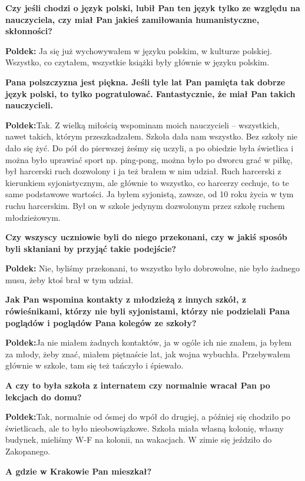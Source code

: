 \textbf{Czy jeśli chodzi o język polski, lubił Pan ten język tylko ze względu na nauczyciela, czy miał Pan jakieś zamiłowania humanistyczne, skłonności?}\par  
\textbf{Poldek:} Ja się już wychowywałem w języku polskim, w kulturze polskiej. Wszystko, co czytałem, wszystkie książki były głównie w języku polskim.\par 
\textbf{Pana polszczyzna jest piękna. Jeśli tyle lat Pan pamięta tak dobrze język polski, to tylko pogratulować. Fantastycznie, że miał Pan takich nauczycieli.}\par
\textbf{Poldek:}Tak. Z wielką miłością wspominam moich nauczycieli – wszystkich, nawet takich, którym przeszkadzałem. Szkoła dała nam wszystko. Bez szkoły nie dało się żyć. Do pół do pierwszej żeśmy się uczyli, a po obiedzie była świetlica i można było uprawiać sport np. ping-pong, można było po dworcu grać w piłkę, był harcerski ruch dozwolony i ja też brałem w nim udział. Ruch harcerski z kierunkiem syjonistycznym, ale głównie to wszystko, co harcerzy cechuje, to te same podstawowe wartości. Ja byłem syjonistą, zawsze, od 10 roku życia w tym ruchu harcerskim. Był on w szkole jedynym dozwolonym przez szkołę ruchem młodzieżowym.\par
\textbf{Czy wszyscy uczniowie byli do niego przekonani, czy w jakiś sposób byli skłaniani by przyjąć takie podejście?}\par
\textbf{Poldek:} Nie, byliśmy przekonani, to wszystko było dobrowolne, nie było żadnego musu, żeby ktoś brał w tym udział.\par  
\textbf{Jak Pan wspomina kontakty z młodzieżą z innych szkół, z rówieśnikami, którzy nie byli syjonistami, którzy nie podzielali Pana poglądów i poglądów Pana kolegów ze szkoły?}\par 
\textbf{Poldek:}Ja nie miałem żadnych kontaktów, ja w ogóle ich nie znałem, ja byłem za młody, żeby znać, miałem piętnaście lat, jak wojna wybuchła. Przebywałem głównie w szkole, tam się też tańczyło i śpiewało.\par
\textbf{A czy to była szkoła z internatem czy normalnie wracał Pan po lekcjach do domu?}\par 
\textbf{Poldek:}Tak, normalnie od ósmej do wpół do drugiej, a później się chodziło po świetlicach, ale to było nieobowiązkowe. Szkoła miała własną kolonię, własny budynek, mieliśmy W-F na kolonii, na wakacjach. W zimie się jeździło do Zakopanego.\par 
\textbf{A gdzie w Krakowie Pan mieszkał?}\par
